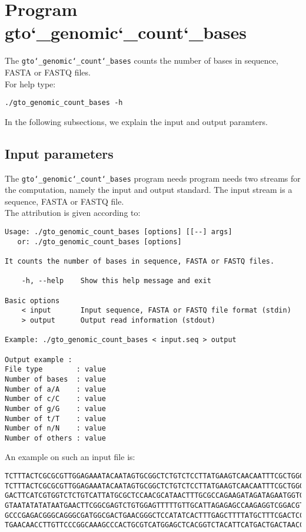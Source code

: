 \section{Program gto\char`_genomic\char`_count\char`_bases}
The \texttt{gto\char`_genomic\char`_count\char`_bases} counts the number of bases in sequence, FASTA or FASTQ files.\\
For help type:
\begin{lstlisting}
./gto_genomic_count_bases -h
\end{lstlisting}
In the following subsections, we explain the input and output paramters.

\subsection*{Input parameters}

The \texttt{gto\char`_genomic\char`_count\char`_bases} program needs program needs two streams for the computation, namely the input and output standard. The input stream is a sequence, FASTA or FASTQ file.\\
The attribution is given according to:
\begin{lstlisting}
Usage: ./gto_genomic_count_bases [options] [[--] args]
   or: ./gto_genomic_count_bases [options]

It counts the number of bases in sequence, FASTA or FASTQ files.

    -h, --help    Show this help message and exit

Basic options
    < input       Input sequence, FASTA or FASTQ file format (stdin)
    > output      Output read information (stdout)

Example: ./gto_genomic_count_bases < input.seq > output

Output example :
File type        : value
Number of bases  : value
Number of a/A    : value
Number of c/C    : value
Number of g/G    : value
Number of t/T    : value
Number of n/N    : value
Number of others : value
\end{lstlisting}
An example on such an input file is:
\begin{lstlisting}
TCTTTACTCGCGCGTTGGAGAAATACAATAGTGCGGCTCTGTCTCCTTATGAAGTCAACAATTTCGCTGGGACTTGCGGC
TCTTTACTCGCGCGTTGGAGAAATACAATAGTGCGGCTCTGTCTCCTTATGAAGTCAACAATTTCGCTGGGACTTGCGGC
GACTTCATCGTGGTCTCTGTCATTATGCGCTCCAACGCATAACTTTGCGCCAGAAGATAGATAGAATGGTGTAAGAAACT
GTAATATATATAATGAACTTCGGCGAGTCTGTGGAGTTTTTGTTGCATTAGAGAGCCAAGAGGTCGGACGTCCTCACGTA
GCCCGAGACGGGCAGGGCGATGGCGACTGAACGGGCTCCATATCACTTTGAGCTTTTATGCTTTCGACTCCTCCAGGAGC
TGAACAACCTTGTTCCCGGCAAAGCCCACTGCGTCATGGAGCTCACGGTCTACATTCATGACTGACTAACCGTAAACTGC
\end{lstlisting}

